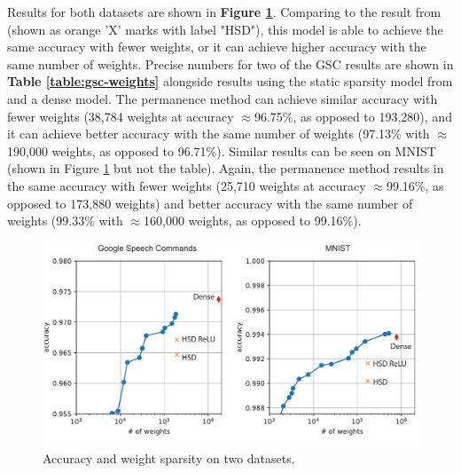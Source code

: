 \documentclass[11pt]{article}
\begin{document}
Results for both datasets are shown in \textbf{Figure \ref{fig:gsc-mnist-main}}. Comparing to the result from \citep{ahmad2019dense} (shown as orange 'X' marks with label "HSD"), this model is able to achieve the same accuracy with fewer weights, or it can achieve higher accuracy with the same number of weights. Precise numbers for two of the GSC results are shown in \textbf{Table \ref{table:gsc-weights}} alongside results using the static sparsity model from \citep{ahmad2019dense} and a dense model. The permanence method can achieve similar accuracy with fewer weights (38,784 weights at accuracy \(\approx\)96.75\%, as opposed to 193,280), and it can achieve better accuracy with the same number of weights (97.13\%  with \(\approx\)190,000 weights, as opposed to 96.71\%). Similar results can be seen on MNIST (shown in Figure \ref{fig:gsc-mnist-main} but not the table). Again, the permanence method results in the same accuracy with fewer weights (25,710 weights at accuracy \(\approx\)99.16\%, as opposed to 173,880 weights) and better accuracy with the same number of weights (99.33\% with \(\approx\)160,000 weights, as opposed to 99.16\%).

\begin{figure}[htbp]
\centering
\includegraphics[width=5in]{./figures/gsc-mnist-main.pdf}
\caption{Accuracy and weight sparsity on two datasets. \label{fig:gsc-mnist-main}}
\end{figure}
\end{document}
